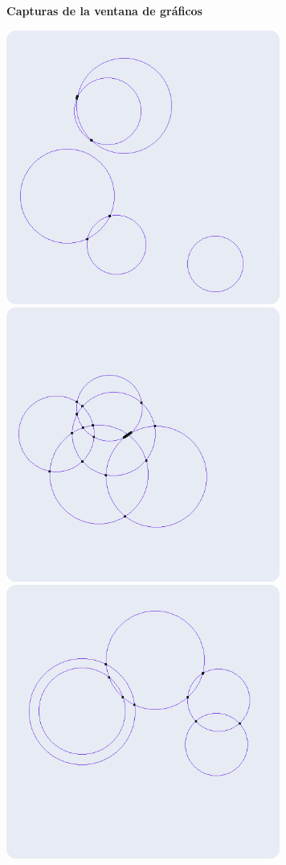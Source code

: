 \documentclass[a4paper]{article}
\begin{document}
\newpage
\Large{\textbf{Capturas de la ventana de gráficos}}\\
\begin{center}
\includegraphics[width=9cm]{src/tarea2_1.png}
\includegraphics[width=9cm]{src/tarea2_2.png}\\[0.15cm]
\includegraphics[width=9cm]{src/tarea2_3.png}

\end{center}
\end{document}
